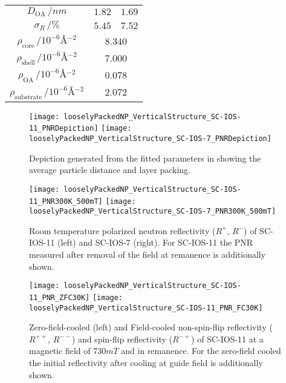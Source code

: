 \documentclass[\main/dresen_thesis.tex]{subfiles}
\begin{document}
\begin{table}[!htbp]
\begin{tabular}{ c | l | l }
       $D_\mathrm{OA} \, / \unit{nm}$                               & $1.82$         & $1.69$ \\
       $\sigma_R      \, / \unit{\%}$                               & $5.45$         & $7.52$ \\
       $\rho_\mathrm{core}\, / \unit{10^{-6} \angstrom^{-2}}      $ & \multicolumn{2}{c}{$8.340$}\\
       $\rho_\mathrm{shell}\, / \unit{10^{-6} \angstrom^{-2}}     $ & \multicolumn{2}{c}{$7.000$}\\
       $\rho_\mathrm{OA}\, / \unit{10^{-6} \angstrom^{-2}}        $ & \multicolumn{2}{c}{$0.078$}\\
       $\rho_\mathrm{substrate}\, / \unit{10^{-6} \angstrom^{-2}} $ & \multicolumn{2}{c}{$2.072$}\\
      \hline
    \end{tabular}
  \end{table}
  \begin{figure}[tb]
    \centering
    \texttt{[image: looselyPackedNP\_VerticalStructure\_SC-IOS-11\_PNRDepiction]}
    \texttt{[image: looselyPackedNP\_VerticalStructure\_SC-IOS-7\_PNRDepiction]}
    \caption{\label{fig:looselyPackedNP:layer:pnrDepiction}Depiction generated from the fitted parameters in  showing the average particle distance and layer packing.}
  \end{figure}

  \begin{figure}[tb]
    \centering
    \texttt{[image: looselyPackedNP\_VerticalStructure\_SC-IOS-11\_PNR300K\_500mT]}
    \texttt{[image: looselyPackedNP\_VerticalStructure\_SC-IOS-7\_PNR300K\_500mT]}
    \caption{\label{fig:looselyPackedNP:layer:pnrRoomTemperatureMagnetic}Room temperature polarized neutron reflectivity ($R^{+},\, R^{-}$) of SC-IOS-11 (left) and SC-IOS-7 (right). For SC-IOS-11 the PNR measured after removal of the field at remanence is additionally shown.}
  \end{figure}
  

  \begin{figure}[tb]
    \centering
    \texttt{[image: looselyPackedNP\_VerticalStructure\_SC-IOS-11\_PNR\_ZFC30K]}
    \texttt{[image: looselyPackedNP\_VerticalStructure\_SC-IOS-11\_PNR\_FC30K]}
    \caption{\label{fig:looselyPackedNP:layer:pnrZFCFCIOS11}Zero-field-cooled (left) and Field-cooled non-spin-flip reflectivity ($R^{++},\,R^{--}$) and spin-flip reflectivity ($R^{-+}$) of SC-IOS-11 at a magnetic field of $730 \unit{mT}$ and in remanence. For the zero-field cooled the initial reflectivity after cooling at guide field is additionally shown.}
  \end{figure}
\end{document}
